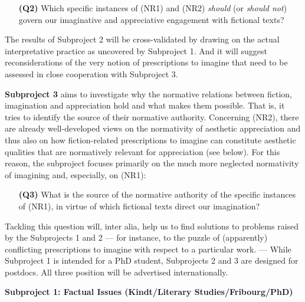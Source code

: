 \vspace{-.1cm}
\begin{itemize}[leftmargin=2cm]
\item[\textbf{(Q2)}] Which specific instances of (NR1) and (NR2) \emph{should} (or \emph{should not}) govern our imaginative and appreciative engagement with fictional texts?
\end{itemize}
\vspace{-.1cm}

\noindent The results of Subproject 2 will be cross-validated by drawing on the actual interpretative practice as uncovered by Subproject 1. And it will suggest reconsiderations of the very notion of prescriptions to imagine that need to be assessed in close cooperation with Subproject 3.

\vspace{.2cm}
\noindent\textbf{Subproject 3} aims to investigate why the normative relations between fiction, imagination and appreciation hold and what makes them possible. That is, it tries to identify the source of their normative authority. Concerning (NR2), there are already well-developed views on the normativity of aesthetic appreciation and thus also on how fiction-related prescriptions to imagine can constitute aesthetic qualities that are normatively relevant for appreciation (see below). For this reason, the subproject focuses primarily on the much more neglected normativity of imagining and, especially, on (NR1): 

\vspace{-.1cm}
\begin{itemize}[leftmargin=2cm]
\item[\textbf{(Q3)}] What is the source of the normative authority of the specific instances of (NR1), in virtue of which fictional texts direct our imagination?
\end{itemize}
\vspace{-.1cm}

\noindent Tackling this question will, inter alia, help us to find solutions to problems raised by the Subprojects 1 and 2 --- for instance, to the puzzle of (apparently) conflicting prescriptions to imagine with respect to a particular work. --- While Subproject 1 is intended for a PhD student, Subprojects 2 and 3 are designed for postdocs. All three position will be advertised internationally.

\vspace{.4cm}
\noindent\textbf{Subproject 1: Factual Issues (Kindt/Literary Studies/Fribourg/PhD)}
\vspace{.2cm}

